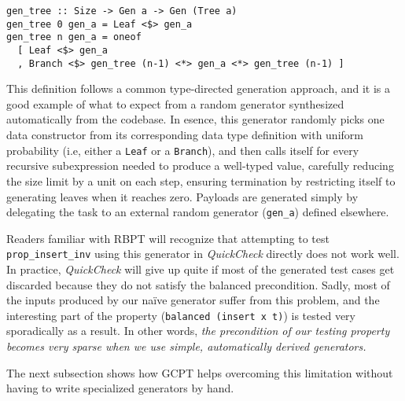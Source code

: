 \documentclass[sigconf, anonymous, review]{acmart}
\newcommand{\quickcheck}{\textit{QuickCheck}\xspace}
\begin{document}

\begin{verbatim}
gen_tree :: Size -> Gen a -> Gen (Tree a)
gen_tree 0 gen_a = Leaf <$> gen_a
gen_tree n gen_a = oneof
  [ Leaf <$> gen_a
  , Branch <$> gen_tree (n-1) <*> gen_a <*> gen_tree (n-1) ]
\end{verbatim}

\noindent This definition follows a common type-directed generation approach,
and it is a good example of what to expect from a random generator synthesized
automatically from the codebase.
%
In esence, this generator randomly picks one data constructor from its
corresponding data type definition with uniform probability (i.e, either a
\texttt{Leaf} or a \texttt{Branch}), and then calls itself for every recursive
subexpression needed to produce a well-typed value, carefully reducing the size
limit by a unit on each step, ensuring termination by restricting itself to
generating leaves when it reaches zero.
%
Payloads are generated simply by delegating the task to an external random
generator (\texttt{gen\_a}) defined elsewhere.
%


Readers familiar with RBPT will recognize that attempting to test
\texttt{prop\_insert\_inv} using this generator in \quickcheck directly does not
work well.
%
In practice, \quickcheck will give up quite if most of the generated test cases
get discarded because they do not satisfy the balanced precondition.
%
Sadly, most of the inputs produced by our na\"ive generator suffer from this
problem, and the interesting part of the property (\texttt{balanced (insert x
  t)}) is tested very sporadically as a result.
%
In other words, \emph{the precondition of our testing property becomes very
  sparse when we use simple, automatically derived generators.}

The next subsection shows how GCPT helps overcoming this limitation without
having to write specialized generators by hand.
\end{document}
